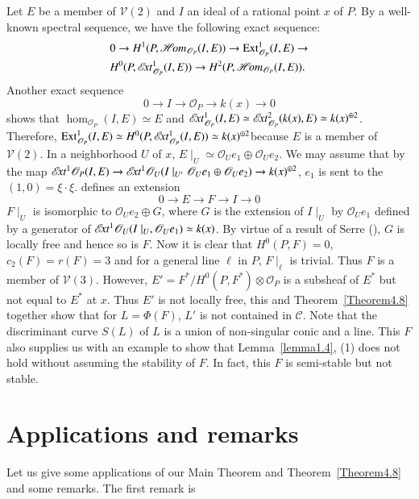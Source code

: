 \begin{EXP}\label{EXP4.9}
Let $E$ be a member of $\mathscr{V}(2)$ and $I$ an ideal of a rational
point $x$ of $P$. By a well-known spectral sequence, we have the
following exact sequence: 
\begin{align*}
& 0\to H^{1}(P,\mathscr{H}\!{\it om}_{\mathscr{O}_P}(I,E))\to
  \operatorname{Ext}^{1}_{\mathscr{O}_P}(I,E)\to\\
& H^{0}(P,\mathscr{E}\!{\it xt}^{1}_{\mathscr{O}_P}(I,E))\to H^{2}(P,\mathscr{H}\!{\it om}_{\mathscr{O}_P}(I,E)).
\end{align*}
Another exact sequence 
$$
0\to I\to \mathscr{O}_P\to k(x)\to 0
$$
shows that $\hom_{\mathscr{O}_P}(I,E)\simeq E$ and
$\mathscr{E}\!{\it xt}^{1}_{\mathscr{O}_P}(I,E)\simeq \mathscr{E}\!{\it xt}^{2}_{\mathscr{O}_P}(k(x),
E)\simeq k(x)^{\oplus 2}$. Therefore,
$\operatorname{Ext}^{1}_{\mathscr{O}_P}(I,E)\simeq
H^{0}(P,\mathscr{E}\!{\it xt}^{1}_{\mathscr{O}_P}(I,E))\simeq k(x)^{\oplus
2}$\pageoriginale because
$E$ is a member of $\mathscr{V}(2)$. In a neighborhood $U$ of $x$,
$E\mid_U\simeq \mathscr{O}_U e_1\oplus \mathscr{O}_U e_2$. We may
assume that by the map $\mathscr{E}\!{\it xt}^{1}\mathscr{O}_P(I,E)\to
\mathscr{E}\!{\it xt}^{1}\mathscr{O}_U(I\mid_{U'}\mathscr{O}_U e_1\oplus \mathscr{O}_U
e_2)\to k(x)^{\oplus 2}$, $e_1$ is sent to the $(1,0)=\xi\cdot
\xi$. defines an extension 
$$
0\to E\to F\to I\to 0
$$
$F\mid_U$ is isomorphic to $\mathscr{O}_U e_2\oplus G$, where $G$ is
the extension of $I\mid_U$ by $\mathscr{O}_U e_1$ defined by a
generator of $\mathscr{E}\!{\it xt}^{1}\mathscr{O}_U(I\mid_U,\mathscr{O}_U e_1)\simeq
k(x)$. By virtue of a result of Serre (\cite{key12}), $G$ is locally
free and hence so is $F$. Now it is clear that $H^{0}(P,F)=0$,
$c_2(F)=r(F)=3$ and for a general line $\ell$ in $P$, $F\mid_{\ell}$ is
trivial. Thus $F$ is a member of $\mathscr{V}(3)$. However,
$E'=F^{\ast}/H^{0} (P,F^{\ast})\otimes \mathscr{O}_P$ is a
subsheaf of $E^{\ast}$ but not equal to $E^{\ast}$ at $x$. Thus $E'$
is not locally free, this and Theorem~\ref{Theorem4.8} together show that
for $L=\Phi(F)$, $L'$ is not contained in $\mathscr{C}$. Note that the
discriminant curve $S(L)$ of $L$ is a union of non-singular conic and
a line. This $F$ also supplies us with an example to show that
Lemma~\ref{lemma1.4}, (1) does not hold without assuming the stability
of $F$. In fact, this $F$ is semi-stable but not stable.
\end{EXP}

\section{Applications and remarks}\label{s5}

Let us give some applications of our Main Theorem and
Theorem~\ref{Theorem4.8} and some remarks. The first remark is 

